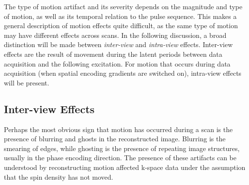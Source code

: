 \documentclass[class=article, crop=false]{standalone}
\begin{document}
The type of motion artifact and its severity depends on the magnitude and type of motion, as well as its temporal relation to the pulse sequence. This makes a general description of motion effects quite difficult, as the same type of motion may have different effects across scans. In the following discussion, a broad distinction will be made between \textit{inter-view} and \textit{intra-view} effects. Inter-view effects are the result of movement during the latent periods between data acquisition and the following excitation. For motion that occurs during data acquisition (when spatial encoding gradients are switched on), intra-view effects will be present.

\subsection{Inter-view Effects}

Perhaps the most obvious sign that motion has occurred during a scan is the presence of blurring and ghosts in the reconstructed image. Blurring is the smearing of edges, while ghosting is the presence of repeating image structures, usually in the phase encoding direction. The presence of these artifacts can be understood by reconstructing motion affected k-space data under the assumption that the spin density has not moved.
\end{document}
